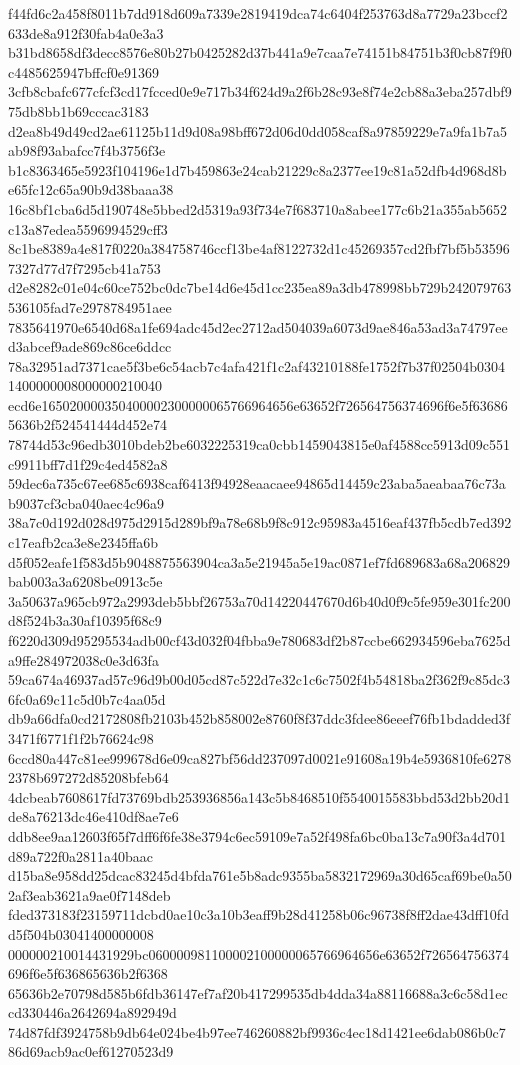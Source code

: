 {f44fd6c2a458f8011b7dd918d609a7339e2819419dca74c6404f253763d8a7729a23bccf2633de8a912f30fab4a0e3a3
b31bd8658df3decc8576e80b27b0425282d37b441a9e7caa7e74151b84751b3f0cb87f9f0c4485625947bffcf0e91369
3cfb8cbafc677cfcf3cd17fcced0e9e717b34f624d9a2f6b28c93e8f74e2cb88a3eba257dbf975db8bb1b69cccac3183
d2ea8b49d49cd2ae61125b11d9d08a98bff672d06d0dd058caf8a97859229e7a9fa1b7a5ab98f93abafcc7f4b3756f3e
b1c8363465e5923f104196e1d7b459863e24cab21229c8a2377ee19c81a52dfb4d968d8be65fc12c65a90b9d38baaa38
16c8bf1cba6d5d190748e5bbed2d5319a93f734e7f683710a8abee177c6b21a355ab5652c13a87edea5596994529cff3
8c1be8389a4e817f0220a384758746ccf13be4af8122732d1c45269357cd2fbf7bf5b535967327d77d7f7295cb41a753
d2e8282c01e04c60ce752bc0dc7be14d6e45d1cc235ea89a3db478998bb729b242079763536105fad7e2978784951aee
7835641970e6540d68a1fe694adc45d2ec2712ad504039a6073d9ae846a53ad3a74797eed3abcef9ade869c86ce6ddcc
78a32951ad7371cae5f3be6c54acb7c4afa421f1c2af43210188fe1752f7b37f02504b03041400000008000000210040
ecd6e165020000350400002300000065766964656e63652f726564756374696f6e5f636865636b2f524541444d452e74
78744d53c96edb3010bdeb2be6032225319ca0cbb1459043815e0af4588cc5913d09c551c9911bff7d1f29c4ed4582a8
59dec6a735c67ee685c6938caf6413f94928eaacaee94865d14459c23aba5aeabaa76c73ab9037cf3cba040aec4c96a9
38a7c0d192d028d975d2915d289bf9a78e68b9f8c912c95983a4516eaf437fb5cdb7ed392c17eafb2ca3e8e2345ffa6b
d5f052eafe1f583d5b9048875563904ca3a5e21945a5e19ac0871ef7fd689683a68a206829bab003a3a6208be0913c5e
3a50637a965cb972a2993deb5bbf26753a70d14220447670d6b40d0f9c5fe959e301fc200d8f524b3a30af10395f68c9
f6220d309d95295534adb00cf43d032f04fbba9e780683df2b87ccbe662934596eba7625da9ffe284972038c0e3d63fa
59ca674a46937ad57c96d9b00d05cd87c522d7e32c1c6c7502f4b54818ba2f362f9c85dc36fc0a69c11c5d0b7c4aa05d
db9a66dfa0cd2172808fb2103b452b858002e8760f8f37ddc3fdee86eeef76fb1bdadded3f3471f6771f1f2b76624c98
6ccd80a447c81ee999678d6e09ca827bf56dd237097d0021e91608a19b4e5936810fe62782378b697272d85208bfeb64
4dcbeab7608617fd73769bdb253936856a143c5b8468510f5540015583bbd53d2bb20d1de8a76213dc46e410df8ae7e6
ddb8ee9aa12603f65f7dff6f6fe38e3794c6ec59109e7a52f498fa6bc0ba13c7a90f3a4d701d89a722f0a2811a40baac
d15ba8e958dd25dcac83245d4bfda761e5b8adc9355ba5832172969a30d65caf69be0a502af3eab3621a9ae0f7148deb
fded373183f23159711dcbd0ae10c3a10b3eaff9b28d41258b06c96738f8ff2dae43dff10fdd5f504b03041400000008
000000210014431929bc060000981100002100000065766964656e63652f726564756374696f6e5f636865636b2f6368
65636b2e70798d585b6fdb36147ef7af20b417299535db4dda34a88116688a3c6c58d1eccd330446a2642694a892949d
74d87fdf3924758b9db64e024be4b97ee746260882bf9936c4ec18d1421ee6dab086b0c786d69acb9ac0ef61270523d9
}
